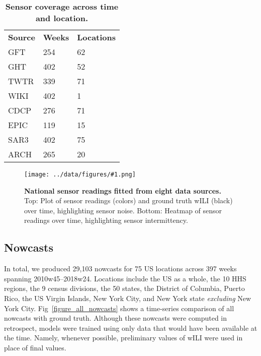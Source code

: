 \documentclass[10pt,letterpaper]{article}
\newlength\savedwidth
\newcommand\thickhline{\noalign{\global\savedwidth\arrayrulewidth\global\arrayrulewidth 2pt}%
\hline
\noalign{\global\arrayrulewidth\savedwidth}}
\newcommand{\maybeincludegraphics}[1]{\texttt{[image: ../data/figures/\#1.png]}}
\begin{document}
\begin{table}[!ht]
  \centering
  \caption{{\bf Sensor coverage across time and location.}}
  \begin{tabular}{|l|l|l|}
    \hline
    {\bf Source} & {\bf Weeks} & {\bf Locations}\\ \thickhline
    GFT & 254 & 62 \\ \hline
    GHT & 402 & 52 \\ \hline
    TWTR & 339 & 71 \\ \hline
    WIKI & 402 & 1 \\ \hline
    CDCP & 276 & 71 \\ \hline
    EPIC & 119 & 15 \\ \hline
    SAR3 & 402 & 75 \\ \hline
    ARCH & 265 & 20 \\ \hline
  \end{tabular}
  \label{table_sensor_breakdown}
\end{table}

\begin{figure}[!ht]
  \maybeincludegraphics{sensor_heatmap}
  \caption{
    {\bf National sensor readings fitted from eight data sources.}
    Top: Plot of sensor readings (colors) and ground truth wILI (black) over
    time, highlighting sensor noise.
    Bottom: Heatmap of sensor readings over time, highlighting sensor
    intermittency.
  }
  \label{figure_sensor_heatmap}
\end{figure}

\subsection*{Nowcasts}


In total, we produced 29,103 nowcasts for 75 US locations across 397 weeks
spanning 2010w45--2018w24. Locations include the US as a whole, the 10 HHS
regions, the 9 census divisions, the 50 states, the District of Columbia,
Puerto Rico, the US Virgin Islands, New York City, and New York state
\textit{excluding} New York City. Fig~\ref{figure_all_nowcasts} shows a
time-series comparison of all nowcasts with ground truth. Although these
nowcasts were computed in retrospect, models were trained using only data that
would have been available at the time. Namely, whenever possible, preliminary
values of wILI were used in place of final values.
\end{document}

